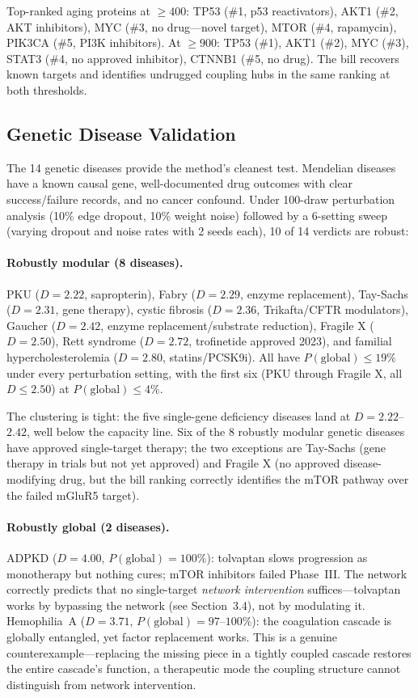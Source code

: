 \documentclass[11pt,a4paper]{article}
\begin{document}
Top-ranked aging proteins at $\geq 400$: TP53 (\#1, p53 reactivators), AKT1 (\#2, AKT inhibitors), MYC (\#3, no drug---novel target), MTOR (\#4, rapamycin), PIK3CA (\#5, PI3K inhibitors). At $\geq 900$: TP53 (\#1), AKT1 (\#2), MYC (\#3), STAT3 (\#4, no approved inhibitor), CTNNB1 (\#5, no drug). The bill recovers known targets and identifies undrugged coupling hubs in the same ranking at both thresholds.

\subsection{Genetic Disease Validation}

The 14 genetic diseases provide the method's cleanest test. Mendelian diseases have a known causal gene, well-documented drug outcomes with clear success/failure records, and no cancer confound. Under 100-draw perturbation analysis (10\% edge dropout, 10\% weight noise) followed by a 6-setting sweep (varying dropout and noise rates with 2 seeds each), 10 of 14 verdicts are robust:

\paragraph{Robustly modular (8 diseases).}
PKU ($D = 2.22$, sapropterin), Fabry ($D = 2.29$, enzyme replacement), Tay-Sachs ($D = 2.31$, gene therapy), cystic fibrosis ($D = 2.36$, Trikafta/CFTR modulators), Gaucher ($D = 2.42$, enzyme replacement/substrate reduction), Fragile X ($D = 2.50$), Rett syndrome ($D = 2.72$, trofinetide approved 2023), and familial hypercholesterolemia ($D = 2.80$, statins/PCSK9i). All have $P(\text{global}) \leq 19\%$ under every perturbation setting, with the first six (PKU through Fragile X, all $D \leq 2.50$) at $P(\text{global}) \leq 4\%$.

The clustering is tight: the five single-gene deficiency diseases land at $D = 2.22$--$2.42$, well below the capacity line. Six of the 8 robustly modular genetic diseases have approved single-target therapy; the two exceptions are Tay-Sachs (gene therapy in trials but not yet approved) and Fragile X (no approved disease-modifying drug, but the bill ranking correctly identifies the mTOR pathway over the failed mGluR5 target).

\paragraph{Robustly global (2 diseases).}
ADPKD ($D = 4.00$, $P(\text{global}) = 100\%$): tolvaptan slows progression as monotherapy but nothing cures; mTOR inhibitors failed Phase~III. The network correctly predicts that no single-target \emph{network intervention} suffices---tolvaptan works by bypassing the network (see Section~3.4), not by modulating it. Hemophilia~A ($D = 3.71$, $P(\text{global}) = 97$--$100\%$): the coagulation cascade is globally entangled, yet factor replacement works. This is a genuine counterexample---replacing the missing piece in a tightly coupled cascade restores the entire cascade's function, a therapeutic mode the coupling structure cannot distinguish from network intervention.
\end{document}
